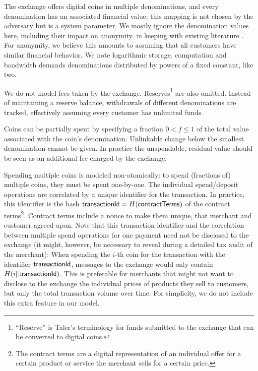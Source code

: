 The exchange offers digital coins in multiple denominations, and every
denomination has an associated financial value; this mapping is not chosen by
the adversary but is a system parameter.  We mostly ignore the denomination
values here, including their impact on anonymity, in keeping with existing
literature \cite{camenisch2007endorsed,pointcheval2017cut}.  For anonymity, we
believe this amounts to assuming that all customers have similar financial
behavior.  We note logarithmic storage, computation and bandwidth demands
denominations distributed by powers of a fixed constant, like two.

We do not model fees taken by the exchange.  Reserves\footnote{%
  ``Reserve'' is Taler's terminology for funds submitted to the exchange that
  can be converted to digital coins.
}
are also omitted.
Instead of maintaining a reserve balance, withdrawals of different
denominations are tracked, effectively assuming every customer has unlimited funds.

Coins can be partially spent by specifying a fraction $0 < f \le 1$ of the
total value associated with the coin's denomination.  Unlinkable change below
the smallest denomination cannot be given.  In
practice the unspendable, residual value should be seen as an additional fee
charged by the exchange.

Spending multiple coins is modeled non-atomically: to spend (fractions
of) multiple coins, they must be spent one-by-one.  The individual
spend/deposit operations are correlated by a unique identifier for the
transaction.  In practice, this identifier is the hash $\mathsf{transactionId} =
H(\mathsf{contractTerms})$ of the contract terms\footnote{The contract terms
are a digital representation of an individual offer for a certain product or service the merchant sells
for a certain price.}.  Contract terms include a nonce to make them
unique, that merchant and customer agreed upon.  Note that this transaction
identifier and the correlation between multiple spend operations for one
payment need not be disclosed to the exchange (it might, however, be necessary
to reveal during a detailed tax audit of the merchant):  When spending the $i$-th coin
for the transaction with the identifier $\mathsf{transactionId}$, messages to the
exchange would only contain $H(i \Vert \mathsf{transactionId})$.  This is preferable
for merchants that might not want to disclose to the exchange the individual
prices of products they sell to customers, but only the total transaction
volume over time.  For simplicity, we do not include this extra feature in our
model.

